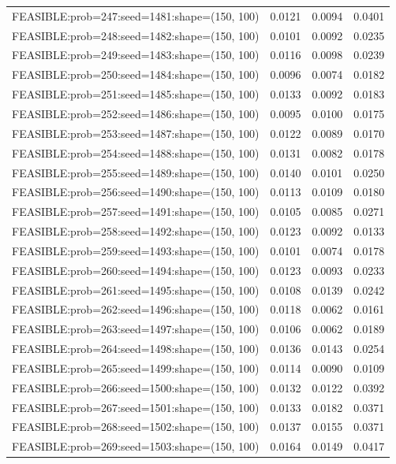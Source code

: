 \begin{longtable}{lccc}
FEASIBLE:prob=247:seed=1481:shape=(150, 100) &   0.0121 & 0.0094 & 0.0401 \\
FEASIBLE:prob=248:seed=1482:shape=(150, 100) &   0.0101 & 0.0092 & 0.0235 \\
FEASIBLE:prob=249:seed=1483:shape=(150, 100) &   0.0116 & 0.0098 & 0.0239 \\
FEASIBLE:prob=250:seed=1484:shape=(150, 100) &   0.0096 & 0.0074 & 0.0182 \\
FEASIBLE:prob=251:seed=1485:shape=(150, 100) &   0.0133 & 0.0092 & 0.0183 \\
FEASIBLE:prob=252:seed=1486:shape=(150, 100) &   0.0095 & 0.0100 & 0.0175 \\
FEASIBLE:prob=253:seed=1487:shape=(150, 100) &   0.0122 & 0.0089 & 0.0170 \\
FEASIBLE:prob=254:seed=1488:shape=(150, 100) &   0.0131 & 0.0082 & 0.0178 \\
FEASIBLE:prob=255:seed=1489:shape=(150, 100) &   0.0140 & 0.0101 & 0.0250 \\
FEASIBLE:prob=256:seed=1490:shape=(150, 100) &   0.0113 & 0.0109 & 0.0180 \\
FEASIBLE:prob=257:seed=1491:shape=(150, 100) &   0.0105 & 0.0085 & 0.0271 \\
FEASIBLE:prob=258:seed=1492:shape=(150, 100) &   0.0123 & 0.0092 & 0.0133 \\
FEASIBLE:prob=259:seed=1493:shape=(150, 100) &   0.0101 & 0.0074 & 0.0178 \\
FEASIBLE:prob=260:seed=1494:shape=(150, 100) &   0.0123 & 0.0093 & 0.0233 \\
FEASIBLE:prob=261:seed=1495:shape=(150, 100) &   0.0108 & 0.0139 & 0.0242 \\
FEASIBLE:prob=262:seed=1496:shape=(150, 100) &   0.0118 & 0.0062 & 0.0161 \\
FEASIBLE:prob=263:seed=1497:shape=(150, 100) &   0.0106 & 0.0062 & 0.0189 \\
FEASIBLE:prob=264:seed=1498:shape=(150, 100) &   0.0136 & 0.0143 & 0.0254 \\
FEASIBLE:prob=265:seed=1499:shape=(150, 100) &   0.0114 & 0.0090 & 0.0109 \\
FEASIBLE:prob=266:seed=1500:shape=(150, 100) &   0.0132 & 0.0122 & 0.0392 \\
FEASIBLE:prob=267:seed=1501:shape=(150, 100) &   0.0133 & 0.0182 & 0.0371 \\
FEASIBLE:prob=268:seed=1502:shape=(150, 100) &   0.0137 & 0.0155 & 0.0371 \\
FEASIBLE:prob=269:seed=1503:shape=(150, 100) &   0.0164 & 0.0149 & 0.0417 \\

\end{longtable}
